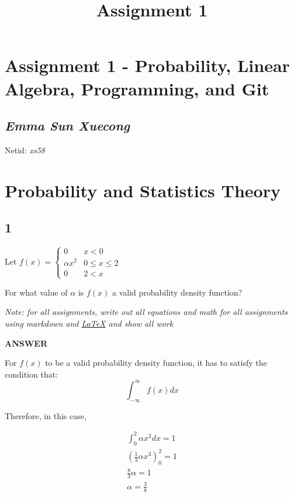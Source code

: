 \documentclass[11pt]{article}
\title{Assignment 1}
\begin{document}
    
    
    \maketitle
    
    

    
    \section{Assignment 1 - Probability, Linear Algebra, Programming, and
Git}\label{assignment-1---probability-linear-algebra-programming-and-git}

\subsection{\texorpdfstring{\emph{Emma Sun
Xuecong}}{Emma Sun Xuecong}}\label{emma-sun-xuecong}

Netid: \emph{xs58}

    \section{Probability and Statistics
Theory}\label{probability-and-statistics-theory}

    \subsection{1}\label{section}

Let
\(f(x) = \begin{cases}  0 & x < 0 \\  \alpha x^2 & 0 \leq x \leq 2 \\  0 & 2 < x  \end{cases}\)

For what value of \(\alpha\) is \(f(x)\) a valid probability density
function?

\emph{Note: for all assignments, write out all equations and math for
all assignments using markdown and
\href{https://tobi.oetiker.ch/lshort/lshort.pdf}{LaTeX} and show all
work}

    \textbf{ANSWER}

    For \(f(x)\) to be a valid probability density function, it has to
satisfy the condition that: \[\int_{-\infty}^{\infty} f(x) dx\]

Therefore, in this case,

\[
\begin{align}
\int_{0}^{2} \alpha x^2 dx=1 \\
(\frac{1}{3}\alpha x^3)_{0}^{2}=1 \\
\frac{8}{3}\alpha=1\\
\alpha=\frac{3}{8}
\end{align}
\]
\end{document}
